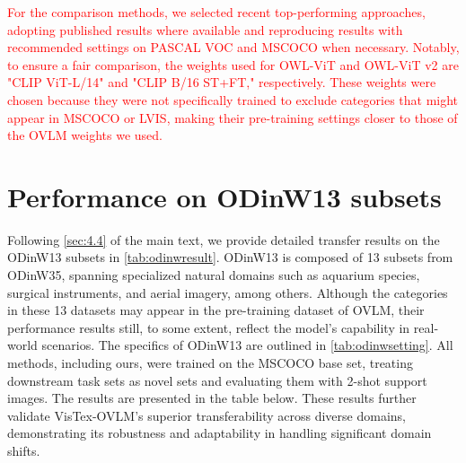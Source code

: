 \textcolor{red}{For the comparison methods, we selected recent top-performing approaches, adopting published results where available and reproducing results with recommended settings on PASCAL VOC and MSCOCO when necessary. Notably, to ensure a fair comparison, the weights used for OWL-ViT and OWL-ViT v2 are "CLIP ViT-L/14" and "CLIP B/16 ST+FT," respectively. These weights were chosen because they were not specifically trained to exclude categories that might appear in MSCOCO or LVIS, making their pre-training settings closer to those of the OVLM weights we used.}

\section{Performance on ODinW13 subsets}

Following \cref{sec:4.4} of the main text, we provide detailed transfer results on the ODinW13 subsets \cite{li2022glip} in \cref{tab:odinwresult}. ODinW13 \cite{li2022odinw} is composed of 13 subsets from ODinW35, spanning specialized natural domains such as aquarium species, surgical instruments, and aerial imagery, among others. Although the categories in these 13 datasets may appear in the pre-training dataset of OVLM, their performance results still, to some extent, reflect the model's capability in real-world scenarios. The specifics of ODinW13 are outlined in \cref{tab:odinwsetting}. All methods, including ours, were trained on the MSCOCO base set, treating downstream task sets as novel sets and evaluating them with 2-shot support images. The results are presented in the table below. These results further validate VisTex-OVLM's superior transferability across diverse domains, demonstrating its robustness and adaptability in handling significant domain shifts.


